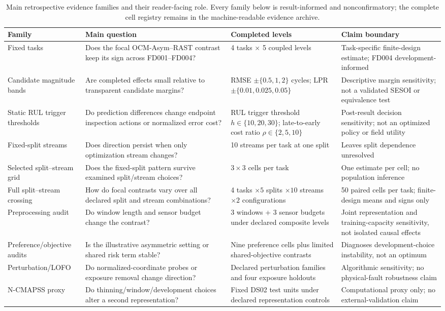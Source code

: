 \documentclass[preprint,12pt,numbers,sort&compress]{elsarticle}
\begin{document}
\begin{table}[!t]
\centering
\scriptsize
\caption{Main retrospective evidence families and their reader-facing role. Every family below is result-informed and nonconfirmatory; the complete cell registry remains in the machine-readable evidence archive.}
\label{tab:families}
\setlength{\tabcolsep}{3.5pt}
\begin{tabular}{@{}p{}p{}p{}p{}@{}}
\toprule
Family & Main question & Completed levels & Claim boundary \\
\midrule
Fixed tasks & Does the focal OCM-Asym--RAST contrast keep its sign across FD001--FD004? & 4 tasks $\times$ 5 coupled levels & Task-specific finite-design estimate; FD004 development-informed \\
Candidate magnitude bands & Are completed effects small relative to transparent candidate margins? & RMSE $\pm\{0.5,1,2\}$ cycles; LPR $\pm\{0.01,0.025,0.05\}$ & Descriptive margin sensitivity; not a validated SESOI or equivalence test \\
Static RUL trigger thresholds & Do prediction differences change endpoint inspection actions or normalized error cost? & RUL trigger threshold $h\in\{10,20,30\}$; late-to-early cost ratio $\rho\in\{2,5,10\}$ & Post-result decision sensitivity; not an optimized policy or field utility \\
Fixed-split streams & Does direction persist when only optimization stream changes? & 10 streams per task at one split & Leaves split dependence unresolved \\
Selected split--stream grid & Does the fixed-split pattern survive examined split/stream choices? & $3\times3$ cells per task & One estimate per cell; no population inference \\
Full split--stream crossing & How do focal contrasts vary over all declared split and stream combinations? & 4 tasks $\times 5$ splits $\times 10$ streams $\times 2$ configurations & 50 paired cells per task; finite-design means and signs only \\
Preprocessing audit & Do window length and sensor budget change the contrast? & 3 windows + 3 sensor budgets under declared composite levels & Joint representation and training-capacity sensitivity, not isolated causal effects \\
Preference/objective audits & Is the illustrative asymmetric setting or shared risk term stable? & Nine preference cells plus limited shared-objective contrasts & Diagnoses development-choice instability, not an optimum \\
Perturbation/LOFO & Do normalized-coordinate probes or exposure removal change direction? & Declared perturbation families and four exposure holdouts & Algorithmic sensitivity; no physical-fault robustness claim \\
N-CMAPSS proxy & Do thinning/window/development choices alter a second representation? & Fixed DS02 test units under declared representation controls & Computational proxy only; no external-validation claim \\
\bottomrule
\end{tabular}
\end{table}
\setlength{\tabcolsep}{6pt}
\FloatBarrier
\end{document}
